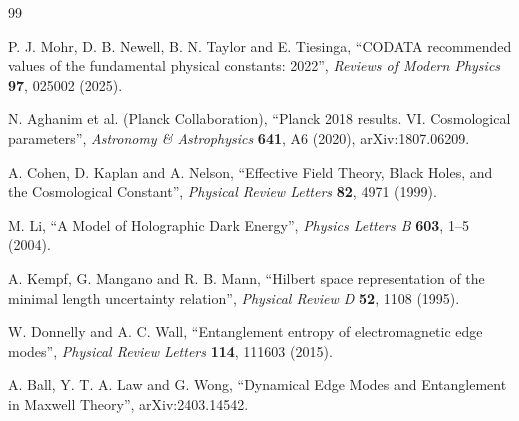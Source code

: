 \documentclass[11pt,a4paper]{article}
\begin{document}
\begin{thebibliography}{99}

P. J. Mohr, D. B. Newell, B. N. Taylor and E. Tiesinga,
``CODATA recommended values of the fundamental physical constants: 2022'',
\emph{Reviews of Modern Physics} \textbf{97}, 025002 (2025).

N. Aghanim et al. (Planck Collaboration),
``Planck 2018 results. VI. Cosmological parameters'',
\emph{Astronomy \& Astrophysics} \textbf{641}, A6 (2020), arXiv:1807.06209.

A. Cohen, D. Kaplan and A. Nelson,
``Effective Field Theory, Black Holes, and the Cosmological Constant'',
\emph{Physical Review Letters} \textbf{82}, 4971 (1999).

M. Li,
``A Model of Holographic Dark Energy'',
\emph{Physics Letters B} \textbf{603}, 1--5 (2004).

A. Kempf, G. Mangano and R. B. Mann,
``Hilbert space representation of the minimal length uncertainty relation'',
\emph{Physical Review D} \textbf{52}, 1108 (1995).

W. Donnelly and A. C. Wall,
``Entanglement entropy of electromagnetic edge modes'',
\emph{Physical Review Letters} \textbf{114}, 111603 (2015).

A. Ball, Y. T. A. Law and G. Wong,
``Dynamical Edge Modes and Entanglement in Maxwell Theory'',
arXiv:2403.14542.

\end{thebibliography}
\end{document}

